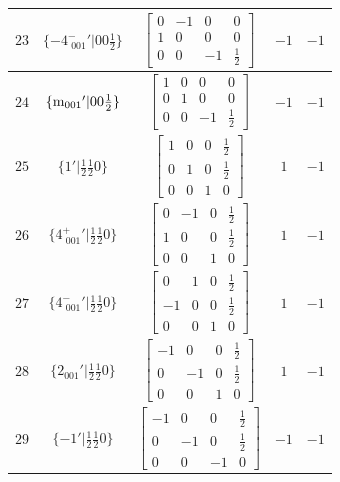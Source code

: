 \documentclass[fleqn,8pt]{jsarticle}
\begin{document}
\begin{longtable}{ccccc}
$ 23 $ & $ \{-4^{-}_{\,\,001}{}'|0 0 \frac{1}{2}\} $ & $ \begin{bmatrix} 0 & -1 & 0 & 0 \\ 1 & 0 & 0 & 0 \\ 0 & 0 & -1 & \frac{1}{2} \end{bmatrix} $ & $ -1 $ & $ -1 $ \\ \hline
$ 24 $ & $ \{{\rm m}_{001}{}'|0 0 \frac{1}{2}\} $ & $ \begin{bmatrix} 1 & 0 & 0 & 0 \\ 0 & 1 & 0 & 0 \\ 0 & 0 & -1 & \frac{1}{2} \end{bmatrix} $ & $ -1 $ & $ -1 $ \\ \hline
$ 25 $ & $ \{1{}'|\frac{1}{2} \frac{1}{2} 0\} $ & $ \begin{bmatrix} 1 & 0 & 0 & \frac{1}{2} \\ 0 & 1 & 0 & \frac{1}{2} \\ 0 & 0 & 1 & 0 \end{bmatrix} $ & $ 1 $ & $ -1 $ \\ \hline
$ 26 $ & $ \{4^{+}_{\,\,001}{}'|\frac{1}{2} \frac{1}{2} 0\} $ & $ \begin{bmatrix} 0 & -1 & 0 & \frac{1}{2} \\ 1 & 0 & 0 & \frac{1}{2} \\ 0 & 0 & 1 & 0 \end{bmatrix} $ & $ 1 $ & $ -1 $ \\ \hline
$ 27 $ & $ \{4^{-}_{\,\,001}{}'|\frac{1}{2} \frac{1}{2} 0\} $ & $ \begin{bmatrix} 0 & 1 & 0 & \frac{1}{2} \\ -1 & 0 & 0 & \frac{1}{2} \\ 0 & 0 & 1 & 0 \end{bmatrix} $ & $ 1 $ & $ -1 $ \\ \hline
$ 28 $ & $ \{2{}_{001}{}'|\frac{1}{2} \frac{1}{2} 0\} $ & $ \begin{bmatrix} -1 & 0 & 0 & \frac{1}{2} \\ 0 & -1 & 0 & \frac{1}{2} \\ 0 & 0 & 1 & 0 \end{bmatrix} $ & $ 1 $ & $ -1 $ \\ \hline
$ 29 $ & $ \{-1{}'|\frac{1}{2} \frac{1}{2} 0\} $ & $ \begin{bmatrix} -1 & 0 & 0 & \frac{1}{2} \\ 0 & -1 & 0 & \frac{1}{2} \\ 0 & 0 & -1 & 0 \end{bmatrix} $ & $ -1 $ & $ -1 $ \\ \hline

\end{longtable}
\end{document}

